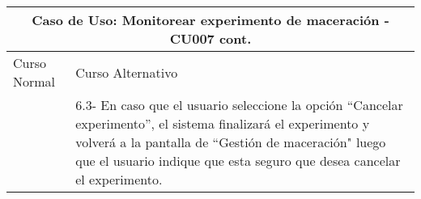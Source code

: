 \begin{table}[H]
\begin{center}
\begin{tabularx}{\textwidth}{ | X | X |}
        \end{tabularx}
    \label{CU007_a}
    \end{center}
    \end{table}
    
    \begin{table}[H]
    \begin{center}
    \begin{tabularx}{\textwidth}{ | X | X |}
    \hline
        \multicolumn{2}{|c|}{\textbf{Caso de Uso: Monitorear experimento de maceración - CU007 cont.}} \\
        \hline
    
        Curso Normal & Curso Alternativo \\
        \hline
        
         & 6.3- En caso que el usuario seleccione la opción ``Cancelar experimento'', el sistema finalizará el experimento y volverá a la pantalla de ``Gestión de maceración" luego que el usuario indique que esta seguro que desea cancelar el experimento.\\
        \hline

    \end{tabularx}
    \label{CU007_b}
    \end{center}
    \end{table}
    
